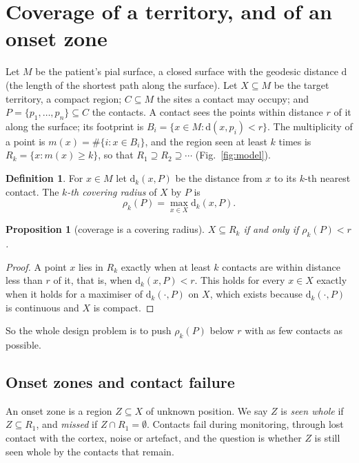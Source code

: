 \documentclass[11pt]{amsart}
\newtheorem{proposition}[theorem]{Proposition}
\theoremstyle{definition}
\newtheorem{definition}[theorem]{Definition}
\theoremstyle{remark}
\newcommand{\dd}{\mathrm{d}}
\begin{document}
\section{Coverage of a territory, and of an onset zone}\label{sec:model}

Let $M$ be the patient's pial surface, a closed surface with the geodesic
distance $\dd$ (the length of the shortest path along the surface). Let
$X\subseteq M$ be the target territory, a compact region; $C\subseteq M$ the
sites a contact may occupy; and $P=\{p_1,\dots,p_n\}\subseteq C$ the contacts.
A contact sees the points within distance $r$ of it along the surface; its
footprint is $B_i=\{x\in M:\dd(x,p_i)<r\}$. The multiplicity of a point is
$m(x)=\#\{i:x\in B_i\}$, and the region seen at least $k$ times is
$R_k=\{x:m(x)\ge k\}$, so that $R_1\supseteq R_2\supseteq\cdots$
(Fig.~\ref{fig:model}).

\begin{definition}
For $x\in M$ let $\dd_k(x,P)$ be the distance from $x$ to its $k$-th nearest
contact. The \emph{$k$-th covering radius} of $X$ by $P$ is
\[
\rho_k(P)=\max_{x\in X}\dd_k(x,P).
\]
\end{definition}

\begin{proposition}[coverage is a covering radius]\label{prop:cover}
$X\subseteq R_k$ if and only if $\rho_k(P)<r$.
\end{proposition}

\begin{proof}
A point $x$ lies in $R_k$ exactly when at least $k$ contacts are within
distance less than $r$ of it, that is, when $\dd_k(x,P)<r$. This holds for
every $x\in X$ exactly when it holds for a maximiser of $\dd_k(\cdot,P)$ on
$X$, which exists because $\dd_k(\cdot,P)$ is continuous and $X$ is compact.
\end{proof}

So the whole design problem is to push $\rho_k(P)$ below $r$ with as few
contacts as possible.

\subsection*{Onset zones and contact failure}
An onset zone is a region $Z\subseteq X$ of unknown position. We say $Z$ is
\emph{seen whole} if $Z\subseteq R_1$, and \emph{missed} if $Z\cap
R_1=\emptyset$. Contacts fail during monitoring, through lost contact with the
cortex, noise or artefact, and the question is whether $Z$ is still seen whole
by the contacts that remain.
\end{document}
